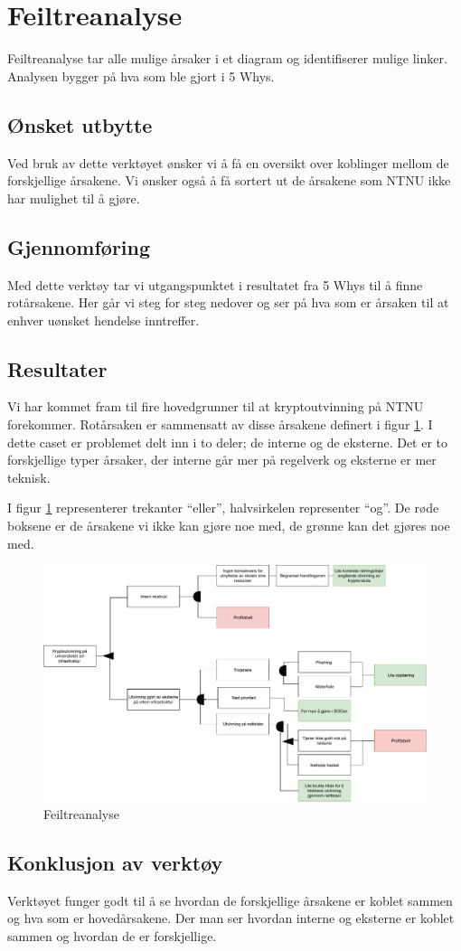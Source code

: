 \section{Feiltreanalyse}
Feiltreanalyse tar alle mulige årsaker i et diagram og identifiserer mulige linker. Analysen bygger på hva som ble gjort i 5 Whys. 

\subsection{Ønsket utbytte}
Ved bruk av dette verktøyet ønsker vi å få en oversikt over koblinger mellom de forskjellige årsakene. Vi ønsker også å få sortert ut de årsakene som NTNU ikke har mulighet til å gjøre.

\subsection{Gjennomføring}
Med dette verktøy tar vi utgangspunktet i resultatet fra 5 Whys til å finne rotårsakene. Her går vi steg for steg nedover og ser på hva som er årsaken til at enhver uønsket hendelse inntreffer.

\subsection{Resultater}
Vi har kommet fram til fire hovedgrunner til at kryptoutvinning på NTNU forekommer. Rotårsaken er sammensatt av disse årsakene definert i figur \ref{fig:feil_tre_analyse}. I dette caset er problemet delt inn i to deler; de interne og de eksterne. Det er to forskjellige typer årsaker, der interne går mer på regelverk og eksterne er mer teknisk.          

I figur \ref{fig:feil_tre_analyse} representerer trekanter ``eller'', halvsirkelen representer ``og''. De røde boksene er de årsakene vi ikke kan gjøre noe med, de grønne kan det gjøres noe med.
 \begin{figure}[H]
    \centering
    \includegraphics[scale=0.45]{case_3/bilder/feil_tre_analyse.pdf}
    \caption[Feiltreanalyse]{Feiltreanalyse}
    \label{fig:feil_tre_analyse}
\end{figure}

\subsection{Konklusjon av verktøy}
Verktøyet funger godt til å se hvordan de forskjellige årsakene er koblet sammen og hva som er hovedårsakene. Der man ser hvordan interne og eksterne er koblet sammen og hvordan de er forskjellige. 
